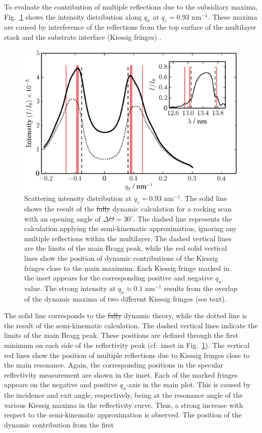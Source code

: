 \documentclass[twocolumn,osajnl,showpacs,superscriptaddress,11pt]{revtex4-1}
\providecommand{\DIFdel}[1]{{\protect\color{red}\sout{#1}}}                      %
\providecommand{\DIFdelbegin}{} %
\providecommand{\DIFdelend}{} %
\providecommand{\DIFdelFL}[1]{\DIFdel{#1}} %
\providecommand{\DIFaddbeginFL}{} %
\providecommand{\DIFaddendFL}{} %
\providecommand{\DIFdelbeginFL}{} %
\providecommand{\DIFdelendFL}{} %
\begin{document}
To evaluate the contribution of multiple reflections due to the subsidiary maxima, Fig.~\ref{fig:kiessig_like_peak} shows the intensity distribution along $q_x$ at $q_z=0.93$ nm$^{-1}$.  These maxima are caused by interference of the reflections from the top surface of the multilayer stack and the substrate interface (Kiessig fringes) \cite{kiessig1931}.
\begin{figure}
        \DIFdelbeginFL %
\DIFdelendFL \DIFaddbeginFL \includegraphics[width=0.5
        \textwidth]{qx_kinematic_vs_dynamic} \DIFaddendFL \caption{Scattering intensity distribution at $q_z=0.93$ nm$^{-1}$. The solid line shows the result of the \DIFdelbeginFL \DIFdelFL{fully }\DIFdelendFL dynamic calculation for a rocking scan with an opening angle of $\Delta\Theta=30^\circ$. The dashed line represents the calculation applying the semi-kinematic approximation, ignoring any multiple reflections within the multilayer. The dashed vertical lines are the limits of the main Bragg peak, while the red solid vertical lines show the position of dynamic contributions of the Kiessig fringes close to the main maximum. Each Kiessig fringe marked in the inset appears for the corresponding positive and negative $q_x$ value. The strong intensity at $q_x\approx0.1$ nm$^{-1}$ results from the overlap of the dynamic maxima of two different Kiessig fringes (see text).} \label{fig:kiessig_like_peak} 
\end{figure}
The solid line corresponds to the \DIFdelbegin \DIFdel{fully }\DIFdelend dynamic theory, while the dotted line is the result of the semi-kinematic calculation. The dashed vertical lines indicate the limits of the main Bragg peak. These positions are defined through the first minimum on each side of the reflectivity peak (cf.~inset in Fig.~\ref{fig:kiessig_like_peak}). The vertical red lines show the position of multiple reflections due to Kiessig fringes close to the main resonance. Again, the corresponding positions in the specular reflectivity measurement are shown in the inset. Each of the marked fringes appears on the negative and positive $q_x$-axis in the main plot. This is caused by the incidence and exit angle, respectively, being at the resonance angle of the various Kiessig maxima in the reflectivity curve. Thus, a strong increase with respect to the semi-kinematic approximation is observed. The position of the dynamic contribution from the first 
\end{document}
